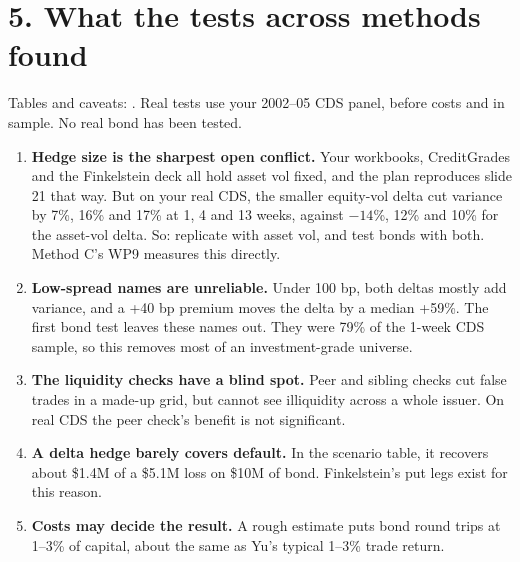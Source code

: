\documentclass[10pt,a4paper]{article}
\newcommand{\f}[1]{\texttt{\detokenize{#1}}}
\begin{document}
\section*{5. What the tests across methods found}
Tables and caveats: \f{scenarios/scenario_tables.pdf}. Real tests use your 2002--05 CDS panel, before costs and in sample. No real bond has been tested.
\begin{enumerate}[leftmargin=*,itemsep=2pt]
\item \textbf{Hedge size is the sharpest open conflict.} Your workbooks, CreditGrades and the Finkelstein deck all hold asset vol fixed, and the plan reproduces slide 21 that way. But on your real CDS, the smaller equity-vol delta cut variance by 7\%, 16\% and 17\% at 1, 4 and 13 weeks, against $-14$\%, 12\% and 10\% for the asset-vol delta. So: replicate with asset vol, and test bonds with both. Method C's WP9 measures this directly.
\item \textbf{Low-spread names are unreliable.} Under 100 bp, both deltas mostly add variance, and a +40 bp premium moves the delta by a median +59\%. The first bond test leaves these names out. They were 79\% of the 1-week CDS sample, so this removes most of an investment-grade universe.
\item \textbf{The liquidity checks have a blind spot.} Peer and sibling checks cut false trades in a made-up grid, but cannot see illiquidity across a whole issuer. On real CDS the peer check's benefit is not significant.
\item \textbf{A delta hedge barely covers default.} In the scenario table, it recovers about \$1.4M of a \$5.1M loss on \$10M of bond. Finkelstein's put legs exist for this reason.
\item \textbf{Costs may decide the result.} A rough estimate puts bond round trips at 1--3\% of capital, about the same as Yu's typical 1--3\% trade return.
\end{enumerate}
\end{document}
